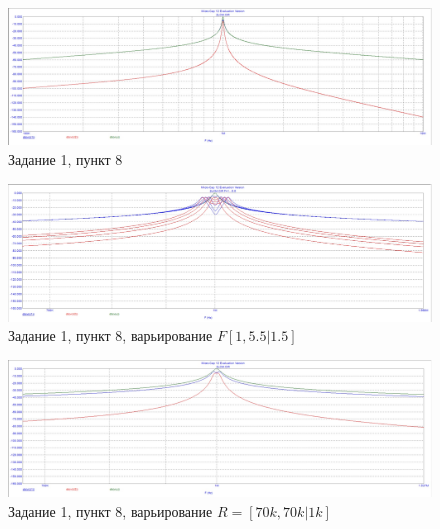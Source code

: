 \documentclass[a4paper, 14pt]{extarticle}%
\begin{document}
\begin{figure}[h!]
	\centering
			\includegraphics[width=1.1\linewidth]{1.8.jpg}
            \caption{Задание 1,  пункт 8}
	\label{A}
\end{figure}

\begin{figure}[h!]
	\centering
			\includegraphics[width=1.1\linewidth]{1.8_VarF.jpg}
            \caption{Задание 1,  пункт 8, варьирование $F [1, 5.5|1.5]$}
	\label{A}
\end{figure}

\begin{figure}[h!]
	\centering
			\includegraphics[width=1.1\linewidth]{1.8_VarR.jpg}
            \caption{Задание 1,  пункт 8, варьирование $R = [70k, 70k|1k]$}
	\label{A}
\end{figure}
\end{document}
